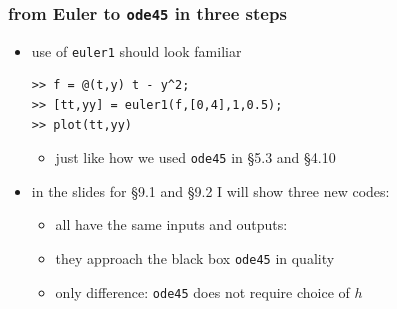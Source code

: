 \documentclass[urlcolor=blue,dvipsnames]{beamer}
\begin{document}
\begin{frame}[fragile]
\frametitle{from Euler to \texttt{ode45} in three steps}

\begin{itemize}
\item use of \texttt{euler1} should look familiar

\begin{Verbatim}[fontsize=\small]
>> f = @(t,y) t - y^2;
>> [tt,yy] = euler1(f,[0,4],1,0.5);
>> plot(tt,yy)
\end{Verbatim}
     \begin{itemize}
     \item just like how we used \texttt{ode45} in \S5.3 and \S4.10
     \end{itemize}
\item in the slides for \S9.1 and \S9.2 I will show three {\color{Green} new codes}:
\color{Green}{
\begin{Verbatim}
function [t,y] = euler1(f,tspan,y0,h)
function [t,y] = improved2(f,tspan,y0,h)
function [t,y] = rk4(f,tspan,y0,h)
\end{Verbatim}
}

\vspace{-2mm}
\color{Black}{
\begin{Verbatim}
function [t,y] = ode45(f,tspan,y0)
\end{Verbatim}
}
    \begin{itemize}
     \item all have the same inputs and outputs:
     \item they approach the black box \texttt{ode45} in quality
     \item only difference: \texttt{ode45} does not require choice of $h$
     \end{itemize}
\end{itemize}
\end{frame}
\end{document}
